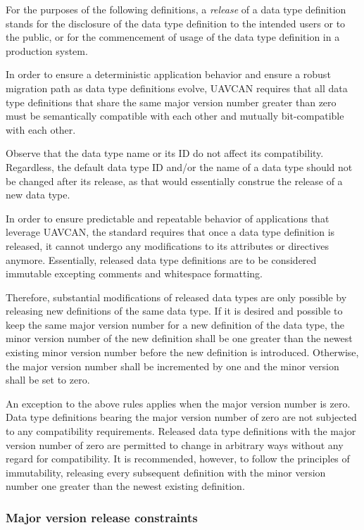 For the purposes of the following definitions, a \emph{release} of a data type definition stands for
the disclosure of the data type definition to the intended users or to the public,
or for the commencement of usage of the data type definition in a production system.

In order to ensure a deterministic application behavior and ensure a robust migration path
as data type definitions evolve, UAVCAN requires that all data type definitions that share the same
major version number greater than zero must be semantically compatible with each other
and mutually bit-compatible with each other.

Observe that the data type name or its ID do not affect its compatibility.
Regardless, the default data type ID and/or the name of a data type should not be changed after its release,
as that would essentially construe the release of a new data type.

In order to ensure predictable and repeatable behavior of applications that leverage UAVCAN,
the standard requires that once a data type definition is released, it cannot undergo any modifications to
its attributes or directives anymore.
Essentially, released data type definitions are to be considered immutable excepting
comments and whitespace formatting.

Therefore, substantial modifications of released data types are only possible by releasing
new definitions of the same data type.
If it is desired and possible to keep the same major version number for a new definition of the data type,
the minor version number of the new definition shall be one greater than the newest existing minor version
number before the new definition is introduced.
Otherwise, the major version number shall be incremented by one and the minor version shall be set to zero.

An exception to the above rules applies when the major version number is zero.
Data type definitions bearing the major version number of zero are not subjected to any compatibility requirements.
Released data type definitions with the major version number of zero are permitted to change in arbitrary
ways without any regard for compatibility.
It is recommended, however, to follow the principles of immutability, releasing every subsequent definition
with the minor version number one greater than the newest existing definition.

\subsubsection{Major version release constraints}

